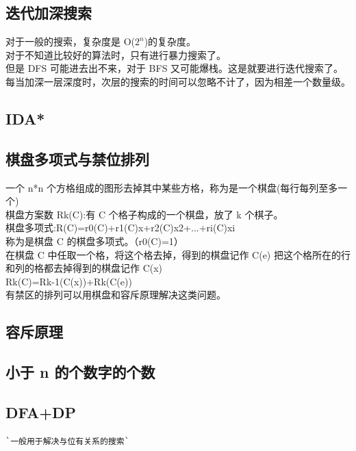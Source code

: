 \documentclass[a4paper]{article}
\begin{document}
\begin{CJK*}{UTF8}{gbsn}
\begin{multicols}{3}
\begin{flushleft}
\subsection{迭代加深搜索}
对于一般的搜索，复杂度是 O($2^n$)的复杂度。\\
对于不知道比较好的算法时，只有进行暴力搜索了。\\
但是 DFS 可能进去出不来，对于 BFS 又可能爆栈。这是就要进行迭代搜索了。\\
每当加深一层深度时，次层的搜索的时间可以忽略不计了，因为相差一个数量级。\\


\subsection{IDA*}



\subsection{棋盘多项式与禁位排列}
一个 n*n 个方格组成的图形去掉其中某些方格，称为是一个棋盘(每行每列至多一个)\\
棋盘方案数 Rk(C):有 C 个格子构成的一个棋盘，放了 k 个棋子。\\
棋盘多项式:R(C)=r0(C)+r1(C)x+r2(C)x2+...+ri(C)xi \\
称为是棋盘 C 的棋盘多项式。（r0(C)=1）\\
在棋盘 C 中任取一个格，将这个格去掉，得到的棋盘记作 C(e) 把这个格所在的行和列的格都去掉得到的棋盘记作 C(x)\\
Rk(C)=Rk-1(C(x))+Rk(C(e))\\
有禁区的排列可以用棋盘和容斥原理解决这类问题。\\


\subsection{容斥原理}



\subsection{小于 n 的个数字的个数}



\subsection{DFA+DP}
\begin{lstlisting}
`一般用于解决与位有关系的搜索`
\end{lstlisting}


\end{flushleft}
\end{multicols}
\end{CJK*}
\end{document}
